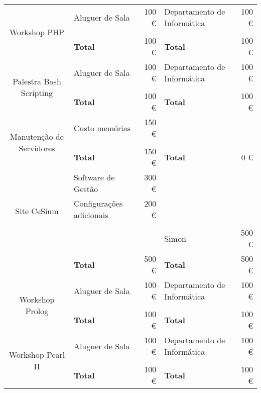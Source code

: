 \begin{center}
{\begin{tabular}{| c | l | r | l | r |}
\multirow{3}{*}{Workshop PHP}
							& Aluguer de Sala	 	& 100 \euro		& Departamento de Informática 	& 100 \euro			\\ \cline{2-5}
							&						&				&								&					\\ \cline{2-5}
							& \textbf{Total}		& 100 \euro		& \textbf{Total}				& 100 \euro			\\ \cline{1-5} \hline

\multirow{3}{*}{Palestra Bash Scripting}
							& Aluguer de Sala	 	& 100 \euro		& Departamento de Informática 	& 100 \euro			\\ \cline{2-5}
							&						&				&								&					\\ \cline{2-5}
							& \textbf{Total}		& 100 \euro		& \textbf{Total}				& 100 \euro			\\ \cline{1-5} \hline

\multirow{3}{*}{Manutenção de Servidores}
							& Custo memórias	 	& 150 \euro		& 								&					\\ \cline{2-5}
							&						&				&								&					\\ \cline{2-5}
							& \textbf{Total}		& 150 \euro		& \textbf{Total}				& 0 \euro			\\ \cline{1-5} \hline

\multirow{4}{*}{Site CeSium}
							& Software de Gestão	& 300 \euro		& 								&					\\ \cline{2-5}
							& Configurações adicionais	& 200 \euro		& 							&					\\ \cline{2-5}
							&						&				&								&					\\ \cline{2-5}
							&						&				& Simon							& 500 \euro			\\ \cline{2-5}
							& \textbf{Total}		& 500 \euro		& \textbf{Total}				& 500 \euro			\\ \cline{1-5} \hline

\multirow{3}{*}{Workshop Prolog}
							& Aluguer de Sala	 	& 100 \euro		& Departamento de Informática 	& 100 \euro			\\ \cline{2-5}
							&						&				&								&					\\ \cline{2-5}
							& \textbf{Total}		& 100 \euro		& \textbf{Total}				& 100 \euro			\\ \cline{1-5} \hline

\multirow{3}{*}{Workshop Pearl II}
							& Aluguer de Sala	 	& 100 \euro		& Departamento de Informática 	& 100 \euro			\\ \cline{2-5}
							&						&				&								&					\\ \cline{2-5}
							& \textbf{Total}		& 100 \euro		& \textbf{Total}				& 100 \euro			\\ \cline{1-5} \hline


\end{tabular}}
\end{center}
